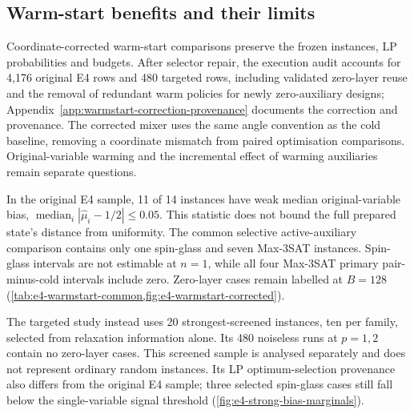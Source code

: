 \documentclass[a4paper,onecolumn,11pt,unpublished]{quantumarticle}
\theoremstyle{remark}
\begin{document}
\subsection{Warm-start benefits and their limits}
\label{sec:results-warmstart}

Coordinate-corrected warm-start comparisons preserve the frozen instances,
LP probabilities and budgets. After selector repair, the execution audit
accounts for 4,176 original E4 rows and 480 targeted rows, including
validated zero-layer reuse and the removal of redundant warm policies for
newly zero-auxiliary designs;
Appendix~\ref{app:warmstart-correction-provenance} documents the correction
and provenance.
The corrected mixer uses the same angle convention as the cold baseline,
removing a coordinate mismatch from paired optimisation comparisons.
Original-variable warming and the incremental effect of warming auxiliaries
remain separate questions.

In the original E4 sample, 11 of 14 instances have weak median
original-variable bias,
$\operatorname{median}_i|\widehat\mu_i-1/2|\leq0.05$.
This statistic does not bound the full prepared state's distance from
uniformity. The common selective active-auxiliary comparison contains only
one spin-glass and seven Max-3SAT instances. Spin-glass intervals are not
estimable at $n=1$, while all four Max-3SAT primary pair-minus-cold intervals
include zero. Zero-layer cases remain labelled
at $B=128$ (\cref{tab:e4-warmstart-common,fig:e4-warmstart-corrected}).

\label{sec:results-strong-bias-warmstart}
The targeted study instead uses 20 strongest-screened instances, ten per
family, selected from relaxation information alone. Its 480 noiseless
runs at $p=1,2$ contain no zero-layer cases. This screened sample is
analysed separately and does not represent ordinary random instances.
Its LP optimum-selection provenance also differs from the original E4
sample; three selected spin-glass cases still fall below the single-variable
signal threshold (\cref{fig:e4-strong-bias-marginals}).
\end{document}
